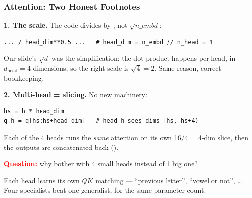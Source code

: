 \begin{frame}[fragile]
    \frametitle{Attention: Two Honest Footnotes}

    \textbf{1. The scale.} The code divides by , not $\sqrt{n\_embd}$:
\begin{lstlisting}
... / head_dim**0.5 ...   # head_dim = n_embd // n_head = 4
\end{lstlisting}
    Our slide's $\sqrt{d}$ was the simplification: the dot product happens \alert{per head}, in $d_{\text{head}} = 4$ dimensions, so the right scale is $\sqrt{4} = 2$. Same reason, correct bookkeeping.

    \pause

    \textbf{2. Multi-head = slicing.} No new machinery:
\begin{lstlisting}
hs = h * head_dim
q_h = q[hs:hs+head_dim]   # head h sees dims [hs, hs+4)
\end{lstlisting}
    Each of the 4 heads runs the \emph{same} attention on its own \alert{16/4 = 4-dim slice}, then the outputs are concatenated back ().

    \pause

    \textcolor{red}{\textbf{Question:}} why bother with 4 small heads instead of 1 big one?

    \pause

    Each head learns its \alert{own} $QK$ matching --- ``previous letter'', ``vowel or not'', \dots\\
    Four specialists beat one generalist, for the same parameter count.
\end{frame}

